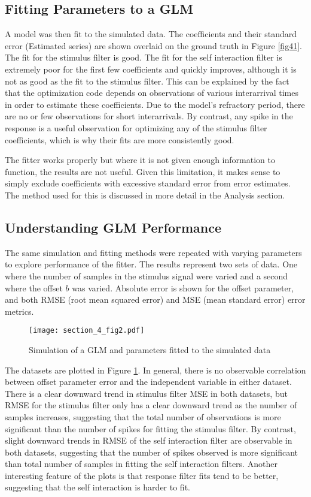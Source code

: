 \documentclass[letterpaper,titlepage,10pt]{article}
\begin{document}
\subsection{Fitting Parameters to a GLM}

A model was then fit to the simulated data. The coefficients and their standard error (Estimated series) are shown
overlaid on the ground truth in Figure \ref{fig41}. The fit for the stimulus filter is good. The fit for the
self interaction filter is extremely poor for the first few coefficients and quickly improves, although it is not as
good as the fit to the stimulus filter. This can be explained by the fact that the optimization code depends on
observations of various interarrival times in order to estimate these coefficients. Due to the model's refractory
period, there are no or few observations for short interarrivals. By contrast, any spike in the response is a useful
observation for optimizing any of the stimulus filter coefficients, which is why their fits are more consistently good.

The fitter works properly but where it is not given enough information to function, the results are not useful. Given
this limitation, it makes sense to simply exclude coefficients with excessive standard error from error estimates. The
method used for this is discussed in more detail in the Analysis section.

\subsection{Understanding GLM Performance}

The same simulation and fitting methods were repeated with varying parameters to explore performance of the fitter.
The results represent two sets of data. One where the number of samples in the stimulus signal were varied and a
second where the offset $b$ was varied. Absolute error is shown for the offset parameter, and both RMSE (root mean
squared error) and MSE (mean standard error) error metrics.

\begin{figure}[h]
\texttt{[image: section\_4\_fig2.pdf]}
\caption{Simulation of a GLM and parameters fitted to the simulated data}
\label{fig42}
\end{figure}

The datasets are plotted in Figure \ref{fig42}. In general, there is no observable correlation between offset parameter
error and the independent variable in either dataset. There is a clear downward trend in stimulus filter MSE in both
datasets, but RMSE for the stimulus filter only has a clear downward trend as the number of samples increases,
suggesting that the total number of observations is more significant than the number of spikes for fitting the stimulus
filter. By contrast, slight downward trends in RMSE of the self interaction filter are observable in both datasets,
suggesting that the number of spikes observed is more significant than total number of samples in fitting the self
interaction filters. Another interesting feature of the plots is that response filter fits tend to be better,
suggesting that the self interaction is harder to fit.
\end{document}
